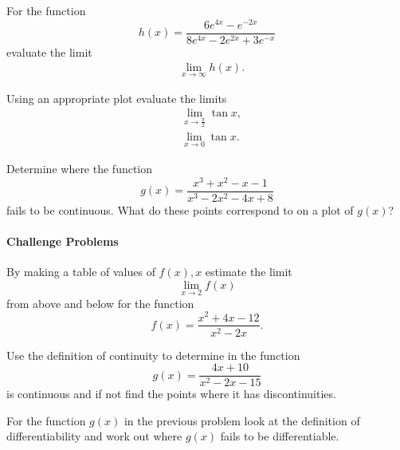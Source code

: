 \begin{problem}[$\dagger$]
For the function
\begin{equation*}
h(x)=\frac{6e^{4x}-e^{-2x}}{8e^{4x}-2e^{2x}+3e^{-x}}
\end{equation*}
evaluate the limit
\begin{align*}
&\lim_{x\to \infty}h(x).
\end{align*}
\end{problem}

\begin{problem}
Using an appropriate plot evaluate the limits
\begin{align*}
&\lim_{x\to \frac{\pi}{2}}\tan x,\\
&\lim_{x\to 0}\tan x.
\end{align*}
\end{problem}

\begin{problem}[$\star$]
Determine where the function
\begin{equation*}
g(x)=\frac{x^{3}+x^{2}-x-1}{x^{3}-2x^{2}-4x+8}
\end{equation*}
fails to be continuous. What do these points correspond to on a plot of $g(x)$?
\end{problem}

\paragraph{Challenge Problems}
\begin{problem}
By making a table of values of $f(x), x$ estimate the limit
\begin{equation*}
\lim_{x\to 2}f(x)
\end{equation*}
from above and below for the function
\begin{equation*}
f(x)=\frac{x^{2}+4x-12}{x^{2}-2x}.
\end{equation*}
\end{problem}

\begin{problem}
Use the definition of continuity to determine in the function
\begin{equation*}
g(x)=\frac{4x+10}{x^{2}-2x-15}
\end{equation*}
is continuous and if not find the points where it has discontinuities.
\end{problem}


\begin{problem}[$\dagger$]
For the function $g(x)$ in the previous problem look at the definition of differentiability and work out where $g(x)$ fails to be differentiable.
\end{problem}

